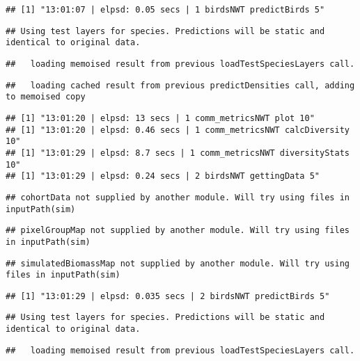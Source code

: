 \documentclass[]{article}
\begin{document}
\begin{verbatim}
## [1] "13:01:07 | elpsd: 0.05 secs | 1 birdsNWT predictBirds 5"
\end{verbatim}

\begin{verbatim}
## Using test layers for species. Predictions will be static and identical to original data.
\end{verbatim}

\begin{verbatim}
##   loading memoised result from previous loadTestSpeciesLayers call.
\end{verbatim}

\begin{verbatim}
##   loading cached result from previous predictDensities call, adding to memoised copy
\end{verbatim}

\begin{verbatim}
## [1] "13:01:20 | elpsd: 13 secs | 1 comm_metricsNWT plot 10"
## [1] "13:01:20 | elpsd: 0.46 secs | 1 comm_metricsNWT calcDiversity 10"
## [1] "13:01:29 | elpsd: 8.7 secs | 1 comm_metricsNWT diversityStats 10"
## [1] "13:01:29 | elpsd: 0.24 secs | 2 birdsNWT gettingData 5"
\end{verbatim}

\begin{verbatim}
## cohortData not supplied by another module. Will try using files in inputPath(sim)
\end{verbatim}

\begin{verbatim}
## pixelGroupMap not supplied by another module. Will try using files in inputPath(sim)
\end{verbatim}

\begin{verbatim}
## simulatedBiomassMap not supplied by another module. Will try using files in inputPath(sim)
\end{verbatim}

\begin{verbatim}
## [1] "13:01:29 | elpsd: 0.035 secs | 2 birdsNWT predictBirds 5"
\end{verbatim}

\begin{verbatim}
## Using test layers for species. Predictions will be static and identical to original data.
\end{verbatim}

\begin{verbatim}
##   loading memoised result from previous loadTestSpeciesLayers call.
\end{verbatim}
\end{document}
